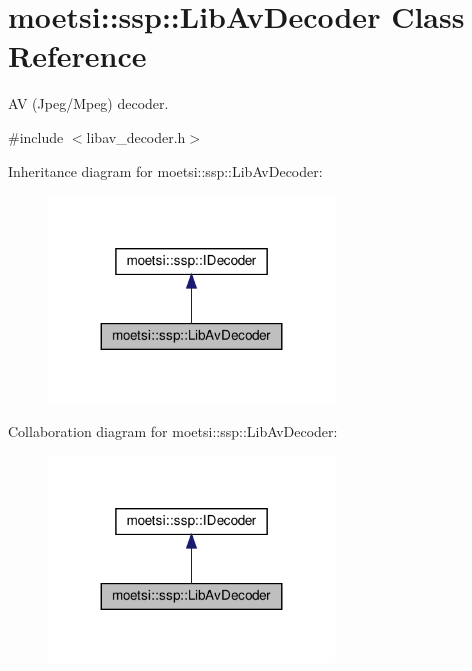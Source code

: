 \hypertarget{classmoetsi_1_1ssp_1_1LibAvDecoder}{}\section{moetsi\+:\+:ssp\+:\+:Lib\+Av\+Decoder Class Reference}
\label{classmoetsi_1_1ssp_1_1LibAvDecoder}


AV (Jpeg/\+Mpeg) decoder.  




{\ttfamily \#include $<$libav\+\_\+decoder.\+h$>$}



Inheritance diagram for moetsi\+:\+:ssp\+:\+:Lib\+Av\+Decoder\+:
\nopagebreak
\begin{figure}[H]
\begin{center}
\leavevmode
\includegraphics[width=215pt]{classmoetsi_1_1ssp_1_1LibAvDecoder__inherit__graph}
\end{center}
\end{figure}


Collaboration diagram for moetsi\+:\+:ssp\+:\+:Lib\+Av\+Decoder\+:
\nopagebreak
\begin{figure}[H]
\begin{center}
\leavevmode
\includegraphics[width=215pt]{classmoetsi_1_1ssp_1_1LibAvDecoder__coll__graph}
\end{center}
\end{figure}
